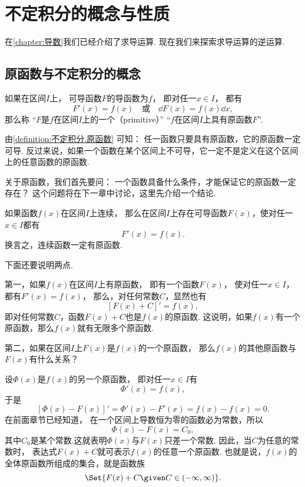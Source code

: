 \section{不定积分的概念与性质}
在\cref{chapter:导数}我们已经介绍了求导运算.
现在我们来探索求导运算的逆运算.

\subsection{原函数与不定积分的概念}
\begin{definition}\label{definition:不定积分.原函数}
如果在区间\(I\)上，
可导函数\(F\)的导函数为\(f\)，
即对任一\(x \in I\)，
都有\[
	F'(x)=f(x)
	\quad\text{或}\quad
	\dd{F(x)}=f(x) \dd{x},
\]
那么称
“\(F\)是\(f\)在区间\(I\)上的一个（primitive）”
“\(f\)在区间\(I\)上具有原函数\(F\)”.
\end{definition}
\begin{remark}
由\cref{definition:不定积分.原函数} 可知：
任一函数只要具有原函数，它的原函数一定可导.
反过来说，如果一个函数在某个区间上不可导，它一定不是定义在这个区间上的任意函数的原函数.
\end{remark}

关于原函数，我们首先要问：
一个函数具备什么条件，才能保证它的原函数一定存在？
这个问题将在下一章中讨论，这里先介绍一个结论.
\begin{theorem}[原函数存在定理]%
如果函数\(f(x)\)在区间\(I\)上连续，
那么在区间\(I\)上存在可导函数\(F(x)\)，使对任一\(x \in I\)都有\[
	F'(x)=f(x).
\]
换言之，连续函数一定有原函数.
\end{theorem}
下面还要说明两点.

第一，如果\(f(x)\)在区间\(I\)上有原函数，
即有一个函数\(F(x)\)，
使对任一\(x \in I\)，
都有\(F'(x) = f(x)\)，
那么，对任何常数\(C\)，显然也有\[
	[F(x) + C]' = f(x),
\]
即对任何常数\(C\)，函数\(F(x) + C\)也是\(f(x)\)的原函数.
这说明，如果\(f(x)\)有一个原函数，那么\(f(x)\)就有无限多个原函数.

第二，如果在区间\(I\)上\(F(x)\)是\(f(x)\)的一个原函数，
那么\(f(x)\)的其他原函数与\(F(x)\)有什么关系？

设\(\Phi(x)\)是\(f(x)\)的另一个原函数，
即对任一\(x \in I\)有\[
	\Phi'(x) = f(x),
\]
于是\[
	[\Phi(x) - F(x)]' = \Phi'(x) - F'(x) = f(x) - f(x) = 0.
\]
在前面章节已经知道，
在一个区间上导数恒为零的函数必为常数，所以\[
	\Phi(x) - F(x) = C_0,
\]
其中\(C_0\)是某个常数.这就表明\(\Phi(x)\)与\(F(x)\)只差一个常数.
因此，当\(C\)为任意的常数时，
表达式\(F(x) + C\)就可表示\(f(x)\)的任意一个原函数.
也就是说，\(f(x)\)的全体原函数所组成的集合，就是函数族\[
	\Set{ F(x) + C \given C \in (-\infty,\infty) }.
\]

